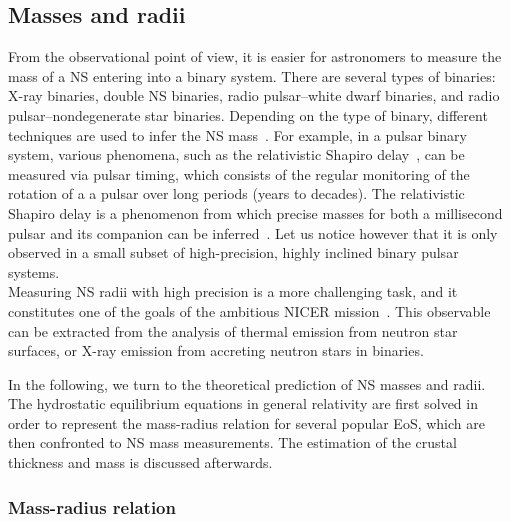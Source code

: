 \subsection{Masses and radii}\label{subsec:masses}

From the observational point of view, it is easier for astronomers to measure 
the mass of a NS entering into a binary system. There are several types of
binaries: X-ray binaries, double NS binaries, radio pulsar--white dwarf 
binaries, and radio pulsar--nondegenerate star binaries. Depending on the type 
of binary, different techniques are used to infer the NS 
mass~\cite{Haensel2007}.
For example, in a pulsar binary system, various phenomena, such as the 
relativistic Shapiro delay~\cite{Shapiro1964}, can be measured via pulsar 
timing, which consists of the regular monitoring of the rotation of a a pulsar 
over long periods (years to decades). The relativistic Shapiro delay is a 
phenomenon from which precise masses for both a millisecond pulsar and its 
companion can be inferred~\cite{Demorest2010,Cromartie2020}. Let us notice 
however that it is only observed in a small subset of high-precision, highly 
inclined binary pulsar systems.\\
Measuring NS radii with high precision is a more challenging task, and it
constitutes one of the goals of the ambitious NICER mission~\cite{NICER}. This
observable can be extracted from the analysis of thermal emission from neutron 
star surfaces, or X-ray emission from accreting neutron stars in binaries.

In the following, we turn to the theoretical prediction of NS masses and radii. 
The hydrostatic equilibrium equations in general relativity are first solved in 
order to represent the mass-radius relation for several popular EoS, which are
then confronted to NS mass measurements. The estimation of the crustal 
thickness and mass is discussed afterwards.

\subsubsection{Mass-radius relation}

